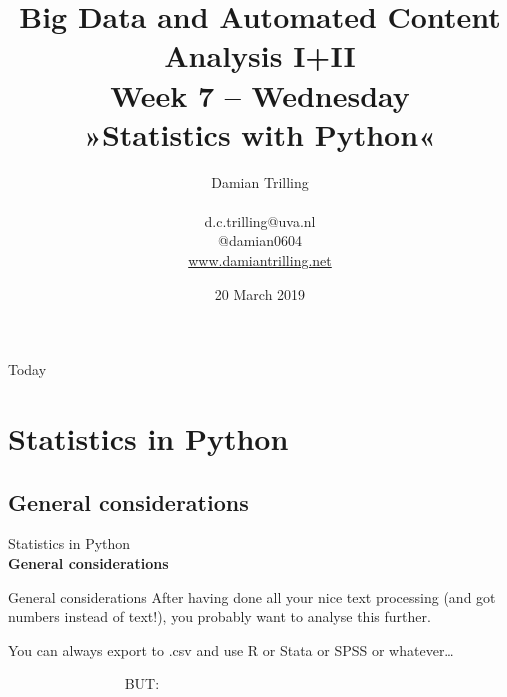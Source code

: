 \documentclass{beamer}
\begin{document}
\title[Big Data and Automated Content Analysis]{\textbf{Big Data and Automated Content Analysis I+II} \\ Week 7 -- Wednesday \\ »Statistics with Python«}
\author[Damian Trilling]{Damian Trilling \\ ~ \\ \footnotesize{d.c.trilling@uva.nl \\@damian0604} \\ \url{www.damiantrilling.net}}
\date{20 March 2019}

\begin{frame}
\titlepage
\end{frame}

\begin{frame}{Today}
\tableofcontents
\end{frame}



\section{Statistics in Python}
\subsection{General considerations}

\begin{frame}[plain]
Statistics in Python\\
\textbf{General considerations}
\end{frame}

\begin{frame}{General considerations}
After having done all your nice text processing (and got numbers instead of text!), you probably want to analyse this further.

You can always export to .csv and use R or Stata or SPSS or whatever\ldots

\vspace{1cm}
\pause

~~~~~~~~~~~~~~~~ \Huge{BUT:}
\end{frame}
\end{document}
